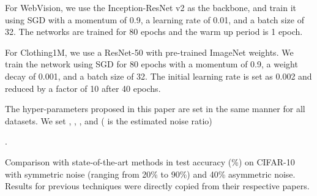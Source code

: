 \documentclass[letterpaper]{article} \usepackage{aaai22}  \usepackage{times}  \usepackage{helvet}  \usepackage{courier}  \usepackage[hyphens]{url}  \usepackage{graphicx} \urlstyle{rm} \def\UrlFont{\rm}  \usepackage{natbib}  \usepackage{caption} \DeclareCaptionStyle{ruled}{labelfont=normalfont,labelsep=colon,strut=off} \frenchspacing  \setlength{\pdfpagewidth}{8.5in}  \setlength{\pdfpageheight}{11in}  \usepackage{algorithm}
\begin{document}
{For WebVision, we use the Inception-ResNet v2 \cite{2017Inception} as the backbone, and train it using SGD with a momentum of 0.9, a learning rate of 0.01, and a batch size of 32. The networks are trained for 80 epochs and the warm up period is 1 epoch.

For Clothing1M, we use a ResNet-50 with pre-trained ImageNet weights. We train the network using SGD for 80 epochs with a momentum of 0.9, a weight decay of 0.001, and a batch size of 32. The initial learning rate is set as 0.002 and reduced by a factor of 10 after 40 epochs. 

The hyper-parameters proposed in this paper are set in the same manner for all datasets. We set , , , and  {( is the estimated noise ratio)}}.

\begin{table}[]
\caption{Comparison with state-of-the-art methods in test accuracy (\%) on CIFAR-10 with symmetric noise (ranging from 20\% to 90\%) and 40\% asymmetric noise. Results for previous techniques were directly copied from their respective papers.}
\vskip 0.15in
\scriptsize
\centering


\end{table}
\end{document}
